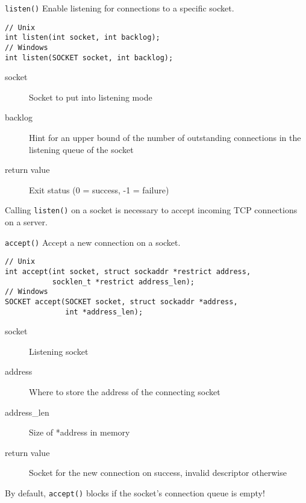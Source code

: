 \begin{frame}[fragile]{\texttt{listen()}}
    Enable listening for connections to a specific socket.
    \begin{lstlisting}[numbers=none,morekeywords={*,SOCKET}]
// Unix
int listen(int socket, int backlog);
// Windows
int listen(SOCKET socket, int backlog);
\end{lstlisting}
    \begin{description}
        \item[socket] Socket to put into listening mode
        \item[backlog] Hint for an upper bound of the number of outstanding
            connections in the listening queue of the socket
        \item[return value] Exit status (0 = success, -1 = failure)
    \end{description}
    \bigskip
    Calling \texttt{listen()} on a socket is necessary to accept incoming TCP
    connections on a server.
\end{frame}

\begin{frame}[fragile]{\texttt{accept()}}
    Accept a new connection on a socket.
    \begin{lstlisting}[numbers=none,morekeywords={*,SOCKET,sockaddr,socklen_t}]
// Unix
int accept(int socket, struct sockaddr *restrict address,
           socklen_t *restrict address_len);
// Windows
SOCKET accept(SOCKET socket, struct sockaddr *address,
              int *address_len);
\end{lstlisting}
    \begin{description}
        \item[socket] Listening socket
        \item[address] Where to store the address of the
            connecting socket
        \item[address\_len] Size of *address in memory
        \item[return value] Socket for the new connection on success, invalid
            descriptor otherwise
    \end{description}
    \bigskip
    By default, \texttt{accept()} blocks if the socket's connection queue is empty!
\end{frame}


